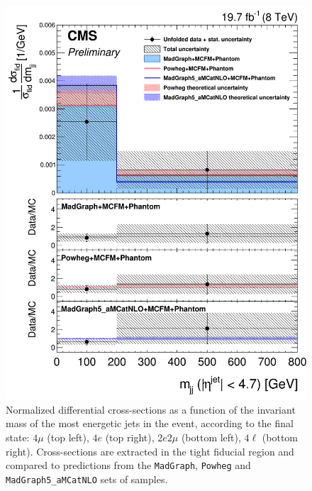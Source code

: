 \begin{figure}[hbtp]
\begin{center}
    \includegraphics[width=\cmsFigWidth]{Figures/DiffCrossSecZZTo4lMjj_Unfolded_fr_MadGraph_norm.png}       
    \caption{\footnotesize{Normalized differential cross-sections as a function of the invariant mass of the most energetic jets in the event, according to the final state: $4\mu$ (top left), $4e$ (top right), $2e2\mu$  (bottom left),  $4\ell$ (bottom right). Cross-sections are extracted in the tight fiducial region and compared to predictions from the \texttt{MadGraph}, \texttt{Powheg} and \texttt{MadGraph5\_aMCatNLO} sets of samples.}}
    \label{fig:diff_xs_mjj}
  \end{center}
\end{figure}

